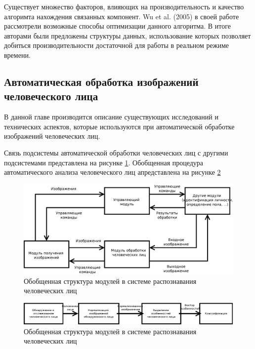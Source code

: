 Существует множество факторов, влияющих на производительность и качество алгоримта нахождения связанных компонент. Wu et al. (2005) в своей работе рассмотрели возможные способы оптимизации данного алгоритма. В итоге авторами были предложены структуры данных, использование которых позволяет добиться производительности достаточной для работы в реальном режиме времени.


\subsection{Автоматическая обработка изображений человеческого лица}

В данной главе производится описание существующих исследований и технических аспектов, которые используются при автоматической обработке изображений человеческих лиц.


Связь подсистемы автоматической обработки человеческих лиц с другими подсистемами представлена на рисунке \ref{fig:sstructure}. Обобщенная процедура автоматического анализа человеческого лиц апредставлена на рисунке \ref{fig:face-analyse-structure}

\begin{figure}
  \centering
  \includegraphics[width=\textwidth]{inc/dia/face-analyse-relation}
  \caption{Обобщенная структура модулей в системе распознавания человеческих лиц}
  \label{fig:sstructure}
\end{figure}

\begin{figure}
  \centering
  \includegraphics[width=\textwidth]{inc/dia/face-analyse}
  \caption{Обобщенная структура модулей в системе распознавания человеческих лиц}
  \label{fig:face-analyse-structure}
\end{figure}

